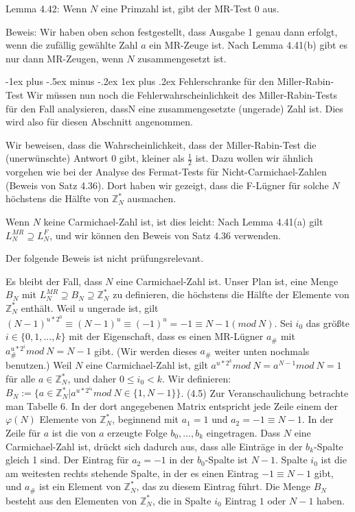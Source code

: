 \documentclass[a4paper]{article}
\makeatletter
\renewcommand{\subsubsection}{\@startsection{subsubsection}{3}{0mm}%
 {-1ex plus -.5ex minus -.2ex}%
 {1ex plus .2ex}%
 {\normalfont\small\bfseries}}
\makeatother
\begin{document}
\begin{multicols}{3}
        Lemma 4.42: Wenn $N$ eine Primzahl ist, gibt der MR-Test $0$ aus.

        Beweis: Wir haben oben schon festgestellt, dass Ausgabe 1 genau dann erfolgt, wenn die zufällig gewählte Zahl $a$ ein MR-Zeuge ist. Nach Lemma 4.41(b) gibt es nur dann MR-Zeugen, wenn $N$ zusammengesetzt ist.

        \subsubsection{Fehlerschranke für den Miller-Rabin-Test}
        Wir müssen nun noch die Fehlerwahrscheinlichkeit des Miller-Rabin-Tests für den Fall analysieren, dassN eine zusammengesetzte (ungerade) Zahl ist. Dies wird also für diesen Abschnitt angenommen.

        Wir beweisen, dass die Wahrscheinlichkeit, dass der Miller-Rabin-Test die (unerwünschte) Antwort $0$ gibt, kleiner als $\frac{1}{2}$ ist. Dazu wollen wir ähnlich vorgehen wie bei der Analyse des Fermat-Tests für Nicht-Carmichael-Zahlen (Beweis von Satz 4.36). Dort haben wir gezeigt, dass die F-Lügner für solche $N$ höchstens die Hälfte von $\mathbb{Z}^*_N$ ausmachen.

        Wenn $N$ keine Carmichael-Zahl ist, ist dies leicht: Nach Lemma 4.41(a) gilt $L^{MR}_N \supseteq L^F_N$, und wir können den Beweis von Satz 4.36 verwenden.

        Der folgende Beweis ist nicht prüfungsrelevant.

        Es bleibt der Fall, dass $N$ eine Carmichael-Zahl ist. Unser Plan ist, eine Menge $B_N$ mit $L^{MR}_N \supseteq B_N \supseteq \mathbb{Z}^*_N$ zu definieren, die höchstens die Hälfte der Elemente von $\mathbb{Z}^*_N$ enthält. Weil $u$ ungerade ist, gilt $(N-1)^{u*2^0} \equiv (N-1)^u\equiv (-1)^u= -1 \equiv N-1 (mod\ N)$. Sei $i_0$ das größte $i\in\{0,1,...,k\}$ mit der Eigenschaft, dass es einen MR-Lügner $a_{\#}$ mit $a_{\#}^{u*2^i} mod\ N =N-1$ gibt. (Wir werden dieses $a_{\#}$ weiter unten nochmals benutzen.) Weil $N$ eine Carmichael-Zahl ist, gilt $a^{u*2^k} mod\ N=a^{N-1} mod\ N= 1$ für alle $a\in\mathbb{Z}^*_N$, und daher $0\leq i_0 < k$. Wir definieren: $B_N:=\{a\in\mathbb{Z}^*_N | a^{u*2^{i_0}} mod\ N\in\{1,N-1\}\}$. (4.5)
        Zur Veranschaulichung betrachte man Tabelle 6. In der dort angegebenen Matrix entspricht jede Zeile einem der $\varphi(N)$ Elemente von $\mathbb{Z}^*_N$, beginnend mit $a_1 = 1$ und $a_2=-1 \equiv N-1$. In der Zeile für $a$ ist die von $a$ erzeugte Folge $b_0,...,b_k$ eingetragen. Dass $N$ eine Carmichael-Zahl ist, drückt sich dadurch aus, dass alle Einträge in der $b_k$-Spalte gleich 1 sind. Der Eintrag für $a_2=-1$ in der $b_0$-Spalte ist $N-1$. Spalte $i_0$ ist die am weitesten rechts stehende Spalte, in der es einen Eintrag $-1 \equiv N-1$ gibt, und $a_{\#}$ ist ein Element von $\mathbb{Z}^*_N$, das zu diesem Eintrag führt. Die Menge $B_N$ besteht aus den Elementen von $\mathbb{Z}^*_N$, die in Spalte $i_0$ Eintrag $1$ oder $N-1$ haben.


\end{multicols}
\end{document}
